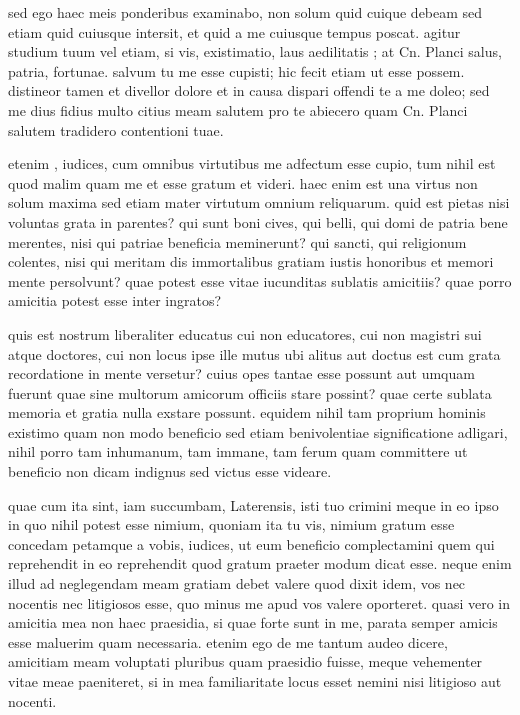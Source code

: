  sed ego haec meis ponderibus examinabo, non solum quid cuique debeam sed etiam quid cuiusque intersit, et quid a me cuiusque tempus poscat. agitur studium tuum vel etiam, si vis, existimatio, laus aedilitatis ; at Cn. Planci salus, patria, fortunae. salvum tu me esse cupisti; hic fecit etiam ut esse possem. distineor tamen et divellor dolore et in causa dispari offendi te a me doleo; sed me dius fidius multo citius meam salutem pro te abiecero quam Cn. Planci salutem tradidero contentioni tuae.

 etenim , iudices, cum omnibus virtutibus me adfectum esse cupio, tum nihil est quod malim quam me et esse gratum et videri. haec enim est una virtus non solum maxima sed etiam mater virtutum omnium reliquarum. quid est pietas nisi voluntas grata in parentes? qui sunt boni cives, qui belli, qui domi de patria bene merentes, nisi qui patriae beneficia meminerunt? qui sancti, qui religionum colentes, nisi qui meritam dis immortalibus gratiam iustis honoribus et memori mente persolvunt? quae potest esse vitae iucunditas sublatis amicitiis? quae porro amicitia potest esse inter ingratos?

 quis est nostrum liberaliter educatus cui non educatores, cui non magistri sui atque doctores, cui non locus ipse ille mutus ubi alitus aut doctus est cum grata recordatione in mente versetur? cuius opes tantae esse possunt aut umquam fuerunt quae sine multorum amicorum officiis stare possint? quae certe sublata memoria et gratia nulla exstare possunt. equidem nihil tam proprium hominis existimo quam non modo beneficio sed etiam benivolentiae significatione adligari, nihil porro tam inhumanum, tam immane, tam ferum quam committere ut beneficio non dicam indignus sed victus esse videare.

 quae cum ita sint, iam succumbam, Laterensis, isti tuo crimini meque in eo ipso in quo nihil potest esse nimium, quoniam ita tu vis, nimium gratum esse concedam petamque a vobis, iudices, ut eum beneficio complectamini quem qui reprehendit in eo reprehendit quod gratum praeter modum dicat esse. neque enim illud ad neglegendam meam gratiam debet valere quod dixit idem, vos nec nocentis nec litigiosos esse, quo minus me apud vos valere oporteret. quasi vero in amicitia mea non haec praesidia, si quae forte sunt in me, parata semper amicis esse maluerim quam necessaria. etenim ego de me tantum audeo dicere, amicitiam meam voluptati pluribus quam praesidio fuisse, meque vehementer vitae meae paeniteret, si in mea familiaritate locus esset nemini nisi litigioso aut nocenti.

